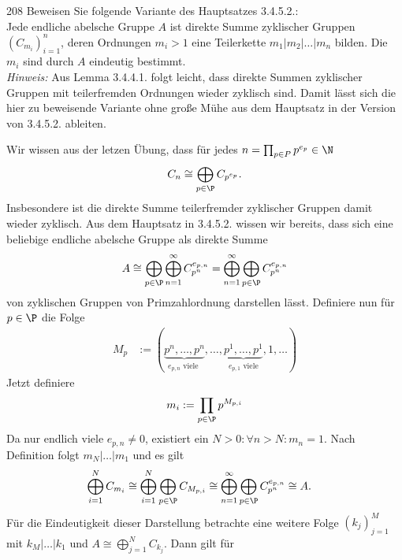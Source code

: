 \begin{algebraUE}{208}
Beweisen Sie folgende Variante des Hauptsatzes 3.4.5.2.: \\
Jede endliche abelsche Gruppe $A$ ist direkte Summe zyklischer Gruppen $(C_{m_i})_{i=1}^n$,
deren Ordnungen $m_i > 1$ eine Teilerkette $m_1 | m_2 | \dots | m_n$ bilden.
Die $m_i$ sind durch $A$ eindeutig bestimmt. \\
\textit{Hinweis:} Aus Lemma 3.4.4.1. folgt leicht, dass direkte Summen zyklischer
Gruppen mit teilerfremden Ordnungen wieder zyklisch sind. Damit lässt sich die
hier zu beweisende Variante ohne große Mühe aus dem Hauptsatz in der Version
von 3.4.5.2. ableiten.
\end{algebraUE}
\begin{solution}
Wir wissen aus der letzen Übung, dass für jedes $n = \prod_{p \in P}p^{e_p}\in \N$
\begin{align*}
  C_n \cong \bigoplus_{p \in \P}C_{p^{e_p}}.
\end{align*}
Insbesondere ist die direkte Summe teilerfremder zyklischer Gruppen damit wieder zyklisch.
Aus dem Hauptsatz in 3.4.5.2. wissen wir bereits, dass sich eine beliebige endliche
abelsche Gruppe als direkte Summe
\begin{align*}
  A \cong \bigoplus_{p \in \P}\bigoplus_{n=1}^{\infty}C_{p^n}^{e_{p,n}}
  =  \bigoplus_{n=1}^{\infty}\bigoplus_{p \in \P}C_{p^n}^{e_{p,n}}
\end{align*}
von zyklischen Gruppen von Primzahlordnung darstellen lässt.
Definiere nun für $p \in \P$ die Folge
\begin{align*}
  M_p &:= (\underbrace{p^n,\dots,p^n}_{e_{p,n} \text{ viele }},\dots,
  \underbrace{p^1,\dots,p^1}_{e_{p,1} \text{ viele}},1,\dots)
\end{align*}
Jetzt definiere
\begin{align*}
  m_i := \prod_{p \in \P}p^{M_{p,i}}
\end{align*}
Da nur endlich viele $e_{p,n} \neq 0$, existiert ein $N > 0: \forall n > N: m_n = 1$.
Nach Definition folgt $m_N | \dots | m_1$ und es gilt
\begin{align*}
  \bigoplus_{i = 1}^{N} C_{m_i} &\cong \bigoplus_{i = 1}^{N}\bigoplus_{p \in \P}C_{M_{p,i}}
  \cong \bigoplus_{n=1}^{\infty}\bigoplus_{p \in \P}C_{p^n}^{e_{p,n}} \cong A.
\end{align*}
Für die Eindeutigkeit dieser Darstellung betrachte eine weitere Folge $(k_j)_{j=1}^M$
mit $k_M | \dots | k_1$ und $A \cong \bigoplus_{j = 1}^{N} C_{k_j}$.
Dann gilt für
\begin{align*}

\end{align*}
\end{solution}
